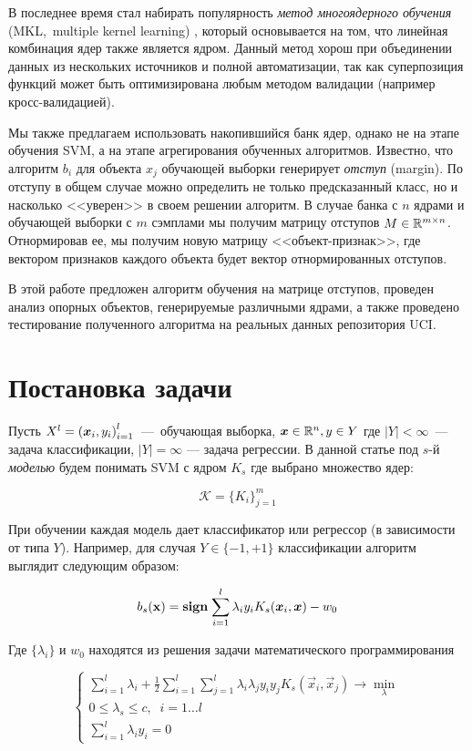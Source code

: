 \documentclass[12pt,twoside]{article}
\begin{document}
    В последнее время стал набирать популярность \emph{метод многоядерного обучения} (MKL,~multiple kernel learning) \cite{Dyrba2015, Bucak2014,Althloothi2014}, который основывается на том, что линейная комбинация ядер также является ядром. Данный метод хорош при объединении данных из нескольких источников и полной автоматизации, так как суперпозиция функций может быть оптимизирована любым методом валидации (например кросс-валидацией).

    Мы также предлагаем использовать накопившийся банк ядер, однако не на этапе обучения SVM, а на этапе агрегирования обученных алгоритмов. Известно, что алгоритм $b_i$ для объекта $x_j$ обучающей выборки генерирует \emph{отступ} (margin). По отступу в общем случае можно определить не только предсказанный класс, но и насколько <<уверен>> в своем решении алгоритм. В случае банка с $n$ ядрами и обучающей выборки с $m$ сэмплами
    мы получим матрицу отступов $M \in \R^{m\times n}$. Отнормировав ее, мы получим новую матрицу <<объект-признак>>, где вектором признаков каждого объекта будет вектор отнормированных отступов.

    В этой работе предложен алгоритм обучения на матрице отступов, проведен анализ опорных объектов, генерируемые различными ядрами, а также проведено тестирование полученного алгоритма на реальных данных репозитория UCI.


\section{Постановка задачи}

Пусть $X^l = \left(\boldsymbol{x}_i, y_i\right)_{i=1}^l$~---~обучающая выборка, $\boldsymbol{x}\in \mathbb{R}^n, y \in Y$ где $|Y| < \infty$~--- задача классификации, $|Y| = \infty$ --- задача регрессии. В данной статье под $s$-й \emph{моделью} будем понимать SVM с
ядром $K_s$ где выбрано множество ядер:

$$
\mathcal{K} = \{K_i\}_{j=1}^m
$$

При обучении каждая модель дает классификатор или регрессор (в зависимости от типа $Y$). Например, для случая $Y \in \{-1, +1\}$ классификации алгоритм выглядит следующим образом:

$$
b_s(\mathbf{x}) = \mathbf{sign}\;{\sum_{i=1}^l\lambda_i y_i K_s(\boldsymbol{x}_i, \boldsymbol{x}) - w_0}
$$

Где $\{\lambda_i\}$ и $w_0$ находятся из решения задачи математического программирования\cite{Smola2004}

\begin{equation*}
 \begin{cases}
   \sum_{i=1}^l \lambda_i + \frac{1}{2}\sum_{i=1}^{l}\sum_{j=1}^{l}
    \lambda_i \lambda_j y_i y_j K_s(\vec{x}_i, \vec{x}_j) \to \min_\lambda
   \\
   0 \leq \lambda_s \leq c, \;\; i = 1\ldots l
   \\
   \sum_{i=1}^l\lambda_i y_i = 0
 \end{cases}
\end{equation*}
\end{document}
